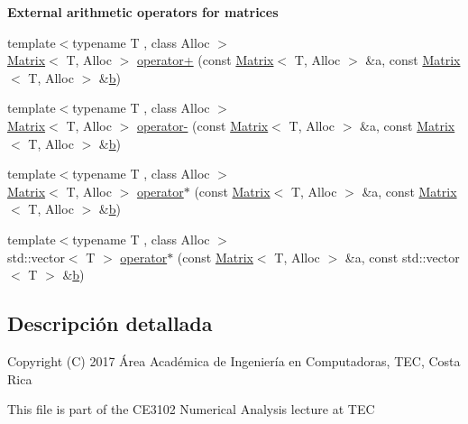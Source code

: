 \begin{Indent}\textbf{ External arithmetic operators for matrices}\par
\begin{DoxyCompactItemize}
\item 
{\footnotesize template$<$typename T , class Alloc $>$ }\\\hyperlink{classanpi_1_1Matrix}{Matrix}$<$ T, Alloc $>$ \hyperlink{namespaceanpi_a423316157aca85d7aefff3fcee900a5e}{operator+} (const \hyperlink{classanpi_1_1Matrix}{Matrix}$<$ T, Alloc $>$ \&a, const \hyperlink{classanpi_1_1Matrix}{Matrix}$<$ T, Alloc $>$ \&\hyperlink{program__options_8cpp_a03799bd905ea96cd38435410694bf05b}{b})
\item 
{\footnotesize template$<$typename T , class Alloc $>$ }\\\hyperlink{classanpi_1_1Matrix}{Matrix}$<$ T, Alloc $>$ \hyperlink{namespaceanpi_a96bd9f3072f6ea35a1d8b5a3f2ff09ae}{operator-\/} (const \hyperlink{classanpi_1_1Matrix}{Matrix}$<$ T, Alloc $>$ \&a, const \hyperlink{classanpi_1_1Matrix}{Matrix}$<$ T, Alloc $>$ \&\hyperlink{program__options_8cpp_a03799bd905ea96cd38435410694bf05b}{b})
\item 
{\footnotesize template$<$typename T , class Alloc $>$ }\\\hyperlink{classanpi_1_1Matrix}{Matrix}$<$ T, Alloc $>$ \hyperlink{namespaceanpi_a2b732f1fc647ede34024f3441c37ae45}{operator$\ast$} (const \hyperlink{classanpi_1_1Matrix}{Matrix}$<$ T, Alloc $>$ \&a, const \hyperlink{classanpi_1_1Matrix}{Matrix}$<$ T, Alloc $>$ \&\hyperlink{program__options_8cpp_a03799bd905ea96cd38435410694bf05b}{b})
\item 
{\footnotesize template$<$typename T , class Alloc $>$ }\\std\+::vector$<$ T $>$ \hyperlink{namespaceanpi_a1f9baeaf135f590f648d63c1a019670c}{operator$\ast$} (const \hyperlink{classanpi_1_1Matrix}{Matrix}$<$ T, Alloc $>$ \&a, const std\+::vector$<$ T $>$ \&\hyperlink{program__options_8cpp_a03799bd905ea96cd38435410694bf05b}{b})
\end{DoxyCompactItemize}
\end{Indent}


\subsection{Descripción detallada}
Copyright (C) 2017 Área Académica de Ingeniería en Computadoras, T\+EC, Costa Rica

This file is part of the C\+E3102 Numerical Analysis lecture at T\+EC

